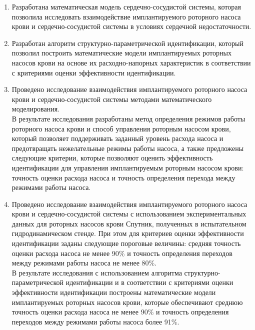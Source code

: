 \begin{enumerate}

    \item Разработана математическая модель сердечно-сосудистой системы, которая позволила исследовать взаимодействие имплантируемого роторного насоса крови и сердечно-сосудистой системы в условиях сердечной недостаточности. 
	\item Разработан алгоритм структурно-параметрической идентификации, который позволил построить математические модели имплантируемых роторных насосов крови на основе их расходно-напорных характеристик в соответствии с критериями оценки эффективности идентификации. 
	\item Проведено исследование взаимодействия имплантируемого роторного насоса крови и сердечно-сосудистой системы методами математического моделирования. \\В результате исследования разработаны метод определения режимов работы роторного насоса крови и способ управления роторным насосом крови, который позволяет поддерживать заданный уровень расхода насоса и предотвращать нежелательные режимы работы насоса, а также предложены следующие критерии, которые позволяют оценить эффективность идентификации для управления имплантируемым роторным насосом крови: точность оценки расхода насоса и точность определения перехода между режимами работы насоса. 
	\item Проведено исследование взаимодействия имплантируемого роторного насоса крови и сердечно-сосудистой системы с использованием экспериментальных данных для роторных насосов крови Спутник, полученных в испытательном гидродинамическом стенде. При этом для критериев оценки эффективности идентификации заданы следующие пороговые величины: средняя точность оценки расхода насоса не менее 90\% и точность определения переходов между режимами работы насоса не менее 80\%. \\В результате исследования с использованием алгоритма структурно-параметрической идентификации и в соответствии с критериями оценки эффективности идентификации построены математические модели имплантируемых роторных насосов крови, которые обеспечивают среднюю точность оценки расхода насоса не менее 90\% и точность определения переходов между режимами работы насоса более 91\%.



\end{enumerate}
